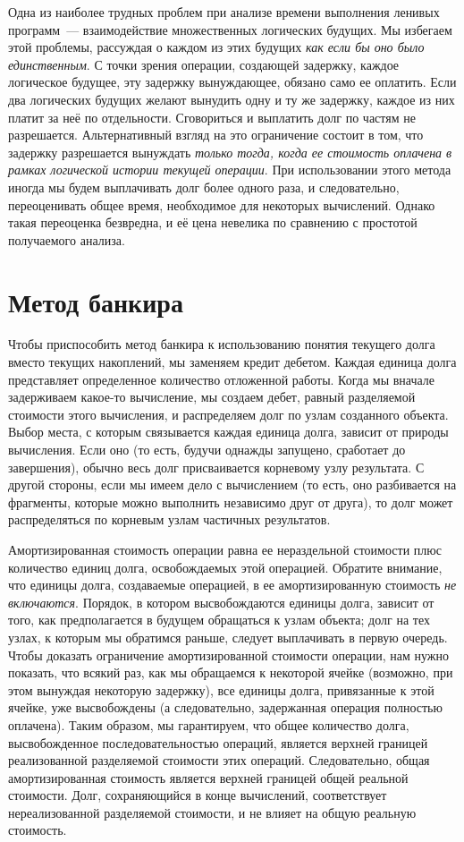 Одна из наиболее трудных проблем при анализе времени выполнения
ленивых программ~--- взаимодействие множественных логических
будущих. Мы избегаем этой проблемы, рассуждая о каждом из этих будущих
\emph{как если бы оно было единственным}. С точки зрения операции,
создающей задержку, каждое логическое будущее, эту задержку
вынуждающее, обязано само ее оплатить. Если два логических будущих
желают вынудить одну и ту же задержку, каждое из них платит за неё по
отдельности. Сговориться и выплатить долг по частям не
разрешается. Альтернативный взгляд на это ограничение состоит в том,
что задержку разрешается вынуждать \emph{только тогда, когда ее
  стоимость оплачена в рамках логической истории текущей операции}.
При использовании этого метода иногда мы будем выплачивать долг более
одного раза, и следовательно, переоценивать общее время, необходимое
для некоторых вычислений. Однако такая переоценка безвредна, и её цена
невелика по сравнению с простотой получаемого анализа.

\section{Метод банкира}
\label{sc:6.3}

Чтобы приспособить метод банкира к использованию понятия текущего
долга вместо текущих накоплений, мы заменяем кредит дебетом. Каждая
единица долга представляет определенное количество отложенной
работы. Когда мы вначале задерживаем какое-то вычисление, мы создаем
дебет, равный разделяемой стоимости этого вычисления, и распределяем
долг по узлам созданного объекта.  Выбор места, с которым связывается
каждая единица долга, зависит от природы вычисления. Если оно
 (то есть, будучи однажды запущено,
сработает до завершения), обычно весь долг присваивается корневому
узлу результата. С другой стороны, если мы имеем дело с
 вычислением (то есть, оно разбивается
на фрагменты, которые можно выполнить независимо друг от друга), то
долг может распределяться по корневым узлам частичных результатов.

Амортизированная стоимость операции равна ее нераздельной стоимости
плюс количество единиц долга, освобождаемых этой операцией. Обратите
внимание, что единицы долга, создаваемые операцией, в ее
амортизированную стоимость \emph{не включаются}. Порядок, в котором
высвобождаются единицы долга, зависит от того, как предполагается в
будущем обращаться к узлам объекта; долг на тех узлах, к которым мы
обратимся раньше, следует выплачивать в первую очередь. Чтобы
доказать ограничение амортизированной стоимости операции, нам нужно
показать, что всякий раз, как мы обращаемся к некоторой ячейке
(возможно, при этом вынуждая некоторую задержку), все единицы долга,
привязанные к этой ячейке, уже высвобождены (а следовательно,
задержанная операция полностью оплачена). Таким образом, мы
гарантируем, что общее количество долга, высвобожденное
последовательностью операций, является верхней границей реализованной
разделяемой стоимости этих операций. Следовательно, общая
амортизированная стоимость является верхней границей общей реальной
стоимости. Долг, сохраняющийся в конце вычислений, соответствует
нереализованной разделяемой стоимости, и не влияет на общую реальную
стоимость.

